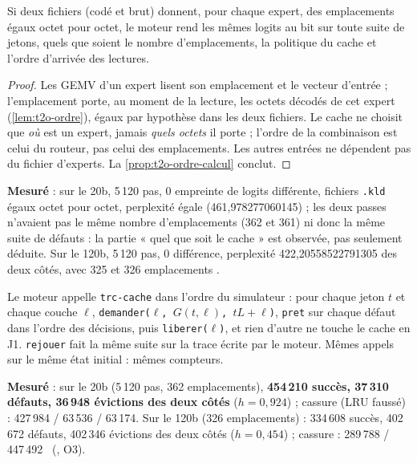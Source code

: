 \begin{proposition}\label{prop:t2o-c3}
Si deux fichiers (codé et brut) donnent, pour chaque expert, des emplacements égaux octet pour octet, le moteur rend les mêmes logits au bit sur toute suite de jetons, quels que soient le nombre d'emplacements, la politique du cache et l'ordre d'arrivée des lectures.
\end{proposition}

\begin{proof}
Les GEMV d'un expert lisent son emplacement et le vecteur d'entrée ; l'emplacement porte, au moment de la lecture, les octets décodés de cet expert (\cref{lem:t2o-ordre}), égaux par hypothèse dans les deux fichiers. Le cache ne choisit que \emph{où} est un expert, jamais \emph{quels octets} il porte ; l'ordre de la combinaison est celui du routeur, pas celui des emplacements. Les autres entrées ne dépendent pas du fichier d'experts. La \cref{prop:t2o-ordre-calcul} conclut.
\end{proof}

\textbf{Mesuré} : sur le 20b, 5\,120 pas, 0 empreinte de logits différente, fichiers \texttt{.kld} égaux octet pour octet, perplexité égale (461,978277060145) ; les deux passes n'avaient pas le même nombre d'emplacements (362 et 361) ni donc la même suite de défauts : la partie « quel que soit le cache » est observée, pas seulement déduite. Sur le 120b, 5\,120 pas, 0 différence, perplexité 422,20558522791305 des deux côtés, avec 325 et 326 emplacements \mes.

\begin{proposition}\label{prop:t2o-compte}
Le moteur appelle \texttt{trc-cache} dans l'ordre du simulateur : pour chaque jeton $t$ et chaque couche $\ell$, \texttt{demander($\ell$, $G(t,\ell)$, $tL + \ell$)}, \texttt{pret} sur chaque défaut dans l'ordre des décisions, puis \texttt{liberer($\ell$)}, et rien d'autre ne touche le cache en J1. \texttt{rejouer} fait la même suite sur la trace écrite par le moteur. Mêmes appels sur le même état initial : mêmes compteurs.
\end{proposition}

\textbf{Mesuré} : sur le 20b (5\,120 pas, 362 emplacements), \textbf{454\,210 succès, 37\,310 défauts, 36\,948 évictions des deux côtés} ($h = 0{,}924$) ; cassure (LRU faussé) : 427\,984 / 63\,536 / 63\,174. Sur le 120b (326 emplacements) : 334\,608 succès, 402\,672 défauts, 402\,346 évictions des deux côtés ($h = 0{,}454$) ; cassure : 289\,788 / 447\,492 \mes~(, O3).

